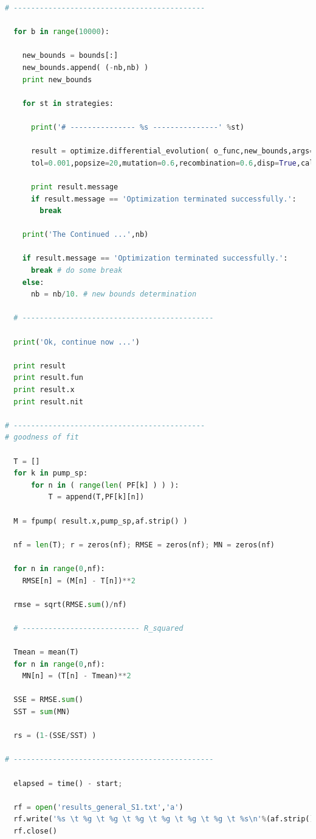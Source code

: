 \begin{lstlisting}[language=Python,caption={Процедура оптимизации на основе алгоритма дифференциальной эволюции на языке программирования Python},label={list:optimization_routine_diff}]
  # --------------------------------------------

  for b in range(10000):

    new_bounds = bounds[:]
    new_bounds.append( (-nb,nb) )
    print new_bounds

    for st in strategies:

      print('# --------------- %s ---------------' %st) 

      result = optimize.differential_evolution( o_func,new_bounds,args=[af.strip()],strategy=st,\
      tol=0.001,popsize=20,mutation=0.6,recombination=0.6,disp=True,callback=print_fun,polish=False )
    
      print result.message
      if result.message == 'Optimization terminated successfully.':
        break

    print('The Continued ...',nb)

    if result.message == 'Optimization terminated successfully.':
      break # do some break
    else:
      nb = nb/10. # new bounds determination

  # --------------------------------------------

  print('Ok, continue now ...')

  print result
  print result.fun
  print result.x
  print result.nit

# --------------------------------------------
# goodness of fit

  T = []
  for k in pump_sp:
      for n in ( range(len( PF[k] ) ) ):
          T = append(T,PF[k][n])

  M = fpump( result.x,pump_sp,af.strip() )

  nf = len(T); r = zeros(nf); RMSE = zeros(nf); MN = zeros(nf)

  for n in range(0,nf):
    RMSE[n] = (M[n] - T[n])**2

  rmse = sqrt(RMSE.sum()/nf)

  # --------------------------- R_squared

  Tmean = mean(T)
  for n in range(0,nf):
    MN[n] = (T[n] - Tmean)**2

  SSE = RMSE.sum()
  SST = sum(MN)

  rs = (1-(SSE/SST) )

# ----------------------------------------------

  elapsed = time() - start;

  rf = open('results_general_S1.txt','a')
  rf.write('%s \t %g \t %g \t %g \t %g \t %g \t %g \t %s\n'%(af.strip(),elapsed/60.,result.nit,result.nfev,result.fun,rs,rmse,result.x) )
  rf.close()


\end{lstlisting}
